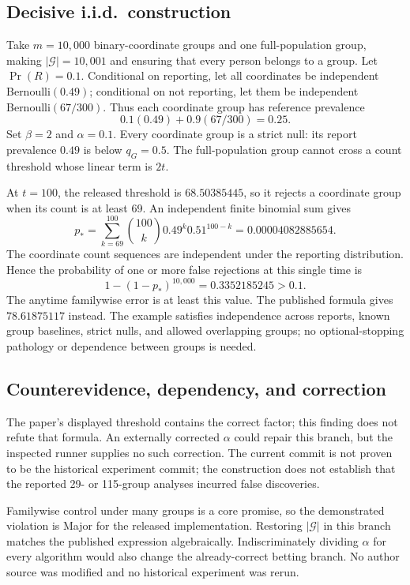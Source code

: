 \documentclass[10pt]{article}
\begin{document}
\subsection*{Decisive i.i.d. construction}
Take \(m=10{,}000\) binary-coordinate groups and one full-population group, making \(|\mathcal G|=10{,}001\) and ensuring that every person belongs to a group. Let \(\Pr(R)=0.1\). Conditional on reporting, let all coordinates be independent Bernoulli\((0.49)\); conditional on not reporting, let them be independent Bernoulli\((67/300)\). Thus each coordinate group has reference prevalence \[0.1(0.49)+0.9(67/300)=0.25.\] Set \(\beta=2\) and \(\alpha=0.1\). Every coordinate group is a strict null: its report prevalence \(0.49\) is below \(q_G=0.5\). The full-population group cannot cross a count threshold whose linear term is \(2t\).\par
At \(t=100\), the released threshold is \(68.50385445\), so it rejects a coordinate group when its count is at least 69. An independent finite binomial sum gives \[p_*=\sum_{k=69}^{100}{100\choose k}0.49^k0.51^{100-k}
       =0.00004082885654.\] The coordinate count sequences are independent under the reporting distribution. Hence the probability of one or more false rejections at this single time is \[1-(1-p_*)^{10{,}000}=0.3352185245>0.1.\] The anytime familywise error is at least this value. The published formula gives \(78.61875117\) instead. The example satisfies independence across reports, known group baselines, strict nulls, and allowed overlapping groups; no optional-stopping pathology or dependence between groups is needed.\par
\subsection*{Counterevidence, dependency, and correction}
The paper’s displayed threshold contains the correct factor; this finding does not refute that formula. An externally corrected \(\alpha\) could repair this branch, but the inspected runner supplies no such correction. The current commit is not proven to be the historical experiment commit; the construction does not establish that the reported 29- or 115-group analyses incurred false discoveries.\par
Familywise control under many groups is a core promise, so the demonstrated violation is Major for the released implementation. Restoring \(|\mathcal G|\) in this branch matches the published expression algebraically. Indiscriminately dividing \(\alpha\) for every algorithm would also change the already-correct betting branch. No author source was modified and no historical experiment was rerun.\par
\end{document}
